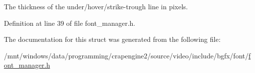 The thickness of the under/hover/strike-\/trough line in pixels. 



Definition at line 39 of file font\+\_\+manager.\+h.



The documentation for this struct was generated from the following file\+:\begin{DoxyCompactItemize}
\item 
/mnt/windows/data/programming/crapengine2/source/video/include/bgfx/font/\hyperlink{font__manager_8h}{font\+\_\+manager.\+h}\end{DoxyCompactItemize}
